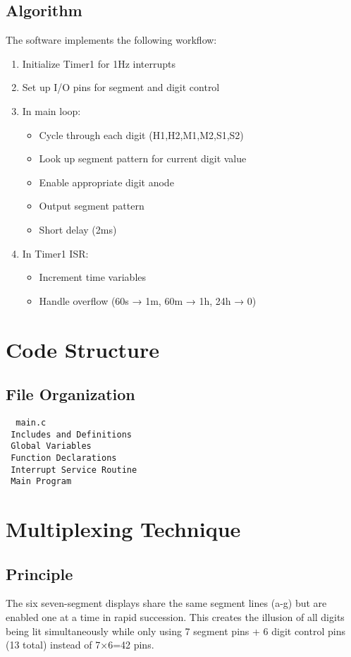\documentclass{article}
\begin{document}
\subsection{Algorithm}
The software implements the following workflow:
\begin{enumerate}
\item Initialize Timer1 for 1Hz interrupts
\item Set up I/O pins for segment and digit control
\item In main loop:
  \begin{itemize}
  \item Cycle through each digit (H1,H2,M1,M2,S1,S2)
  \item Look up segment pattern for current digit value
  \item Enable appropriate digit anode
  \item Output segment pattern
  \item Short delay (2ms)
  \end{itemize}
\item In Timer1 ISR:
  \begin{itemize}
  \item Increment time variables
  \item Handle overflow (60s → 1m, 60m → 1h, 24h → 0)
  \end{itemize}
\end{enumerate}
\section{Code Structure}

\subsection{File Organization}
\begin{verbatim}
  main.c
 Includes and Definitions
 Global Variables
 Function Declarations
 Interrupt Service Routine
 Main Program
\end{verbatim}
\section{Multiplexing Technique}

\subsection{Principle}
The six seven-segment displays share the same segment lines (a-g) but are enabled one at a time in rapid succession. This creates the illusion of all digits being lit simultaneously while only using 7 segment pins + 6 digit control pins (13 total) instead of 7×6=42 pins.
\end{document}
